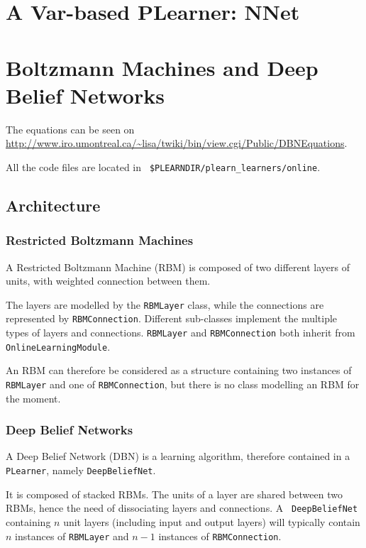 \documentclass[11pt]{book}
\begin{document}
\chapter{A Var-based PLearner: NNet}

\chapter{Boltzmann Machines and Deep Belief Networks}

The equations can be seen on
\url{http://www.iro.umontreal.ca/~lisa/twiki/bin/view.cgi/Public/DBNEquations}.

All the code files are located in {\tt
\$PLEARNDIR/plearn\_learners/online}.

\section{Architecture}

\subsection{Restricted Boltzmann Machines}

A Restricted Boltzmann Machine (RBM) is composed of two different layers
of units, with weighted connection between them.

The layers are modelled by the {\tt RBMLayer} class, while the
connections are represented by {\tt RBMConnection}. Different
sub-classes implement the multiple types of layers and connections.
{\tt RBMLayer} and {\tt RBMConnection} both inherit from {\tt
OnlineLearningModule}.

An RBM can therefore be considered as a structure containing two
instances of {\tt RBMLayer} and one of {\tt RBMConnection}, but there is
no class modelling an RBM for the moment.

\subsection{Deep Belief Networks}

A Deep Belief Network (DBN) is a learning algorithm, therefore contained
in a {\tt PLearner}, namely {\tt DeepBeliefNet}.

It is composed of stacked RBMs. The units of a layer are shared between
two RBMs, hence the need of dissociating layers and connections. A {\tt
DeepBeliefNet} containing $n$ unit layers (including input and output
layers) will typically contain $n$ instances of {\tt RBMLayer} and $n-1$
instances of {\tt RBMConnection}.
\end{document}
